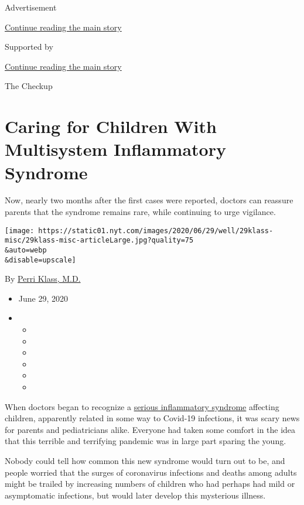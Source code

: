 Advertisement

\protect\hyperlink{after-top}{Continue reading the main story}

Supported by

\protect\hyperlink{after-sponsor}{Continue reading the main story}

The Checkup

\hypertarget{caring-for-children-with-multisystem-inflammatory-syndrome}{%
\section{Caring for Children With Multisystem Inflammatory
Syndrome}\label{caring-for-children-with-multisystem-inflammatory-syndrome}}

Now, nearly two months after the first cases were reported, doctors can
reassure parents that the syndrome remains rare, while continuing to
urge vigilance.

\texttt{[image: https://static01.nyt.com/images/2020/06/29/well/29klass-misc/29klass-misc-articleLarge.jpg?quality=75\\\&auto=webp\\\&disable=upscale]}

By \href{https://www.nytimes.com/by/perri-klass-md}{Perri Klass, M.D.}

\begin{itemize}
\item
  June 29, 2020
\item
  \begin{itemize}
  \item
  \item
  \item
  \item
  \item
  \item
  \end{itemize}
\end{itemize}

When doctors began to recognize a
\href{https://www.nytimes.com/2020/05/05/nyregion/children-Kawasaki-syndrome-coronavirus.html}{serious
inflammatory syndrome} affecting children, apparently related in some
way to Covid-19 infections, it was scary news for parents and
pediatricians alike. Everyone had taken some comfort in the idea that
this terrible and terrifying pandemic was in large part sparing the
young.

Nobody could tell how common this new syndrome would turn out to be, and
people worried that the surges of coronavirus infections and deaths
among adults might be trailed by increasing numbers of children who had
perhaps had mild or asymptomatic infections, but would later develop
this mysterious illness.

